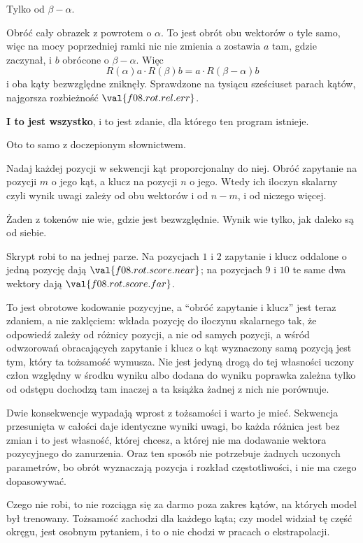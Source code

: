 \begin{fr}
\begin{ansblock}
Tylko od $\beta - \alpha$.
\end{ansblock}

Obróć cały obrazek z powrotem o $\alpha$. To jest obrót obu wektorów o tyle
samo, więc na mocy poprzedniej ramki nic nie zmienia \dash{} a zostawia $a$
tam, gdzie zaczynał, i $b$ obrócone o $\beta - \alpha$. Więc
\[ R(\alpha)a \cdot R(\beta)b = a \cdot R(\beta - \alpha)b \]
i oba kąty bezwzględne zniknęły. Sprawdzone na tysiącu sześciuset parach
kątów, najgorsza rozbieżność $\val{f08.rot.rel.err}$.

\textbf{I to jest wszystko}, i to jest zdanie, dla którego ten program
istnieje.
\end{fr}

\begin{fr}
Oto to samo z doczepionym słownictwem.

Nadaj każdej pozycji w sekwencji kąt proporcjonalny do niej. Obróć zapytanie
na pozycji $m$ o jego kąt, a klucz na pozycji $n$ o jego. Wtedy ich iloczyn
skalarny \dash{} czyli wynik uwagi \dash{} zależy od obu wektorów i od
$n - m$, i od niczego więcej.

Żaden z tokenów nie wie, gdzie jest bezwzględnie. Wynik wie tylko, jak daleko
są od siebie.

Skrypt robi to na jednej parze. Na pozycjach $1$ i $2$ zapytanie i klucz
oddalone o jedną pozycję dają $\val{f08.rot.score.near}$; na pozycjach $9$ i
$10$ te same dwa wektory dają $\val{f08.rot.score.far}$.

\begin{aibox}
To jest obrotowe kodowanie pozycyjne, a \enquote{obróć zapytanie i klucz} jest
teraz zdaniem, a nie zaklęciem: wkłada pozycję do iloczynu skalarnego tak, że
odpowiedź zależy od różnicy pozycji, a nie od samych pozycji, a wśród
odwzorowań obracających zapytanie i klucz o kąt wyznaczony samą pozycją jest
tym, który ta tożsamość wymusza. Nie jest jedyną drogą do tej własności
\dash{} uczony człon względny w środku wyniku albo dodana do wyniku
poprawka zależna tylko od odstępu dochodzą tam inaczej \dash{} a ta książka
żadnej z nich nie porównuje.

Dwie konsekwencje wypadają wprost z tożsamości i warto je mieć. Sekwencja
przesunięta w całości daje identyczne wyniki uwagi, bo każda różnica jest bez
zmian \dash{} i to jest własność, której chcesz, a której nie ma dodawanie
wektora pozycyjnego do zanurzenia. Oraz ten sposób nie potrzebuje żadnych
uczonych parametrów, bo obrót wyznaczają pozycja i rozkład częstotliwości, i
nie ma czego dopasowywać.

Czego nie robi, to nie rozciąga się za darmo poza zakres kątów, na których
model był trenowany. Tożsamość zachodzi dla każdego kąta; czy model widział
tę część okręgu, jest osobnym pytaniem, i to o nie chodzi w pracach o
ekstrapolacji.
\end{aibox}

\end{fr}

